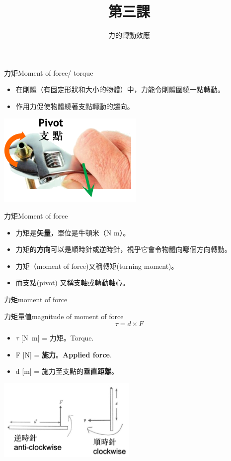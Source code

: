 \documentclass[beamer=true]{standalone}
\title{第三課}
\author{力的轉動效應}
\institute{全年班}
\date{}
\begin{document}
\frame{\titlepage}


\begin{frame}{力矩Moment of force/ torque}
    \begin{itemize}
        \item 在剛體（有固定形狀和大小的物體）中，力能令剛體圍繞一點轉動。
        \item 作用力促使物體繞著支點轉動的趨向。
    \end{itemize}\bigskip
    {\par\centering
        \includegraphics[width=.4\textwidth]{assets/76cf8376.png}
        \par}
\end{frame}
\begin{frame}{力矩Moment of force}
    \begin{itemize}
        \item 力矩是\textbf{矢量}，單位是牛頓米（N m）。
        \item 力矩的\textbf{方向}可以是順時針或逆時針，視乎它會令物體向哪個方向轉動。
        \item 力矩（moment of force)又稱轉矩(turning moment)。
        \item 而支點(pivot) 又稱支軸或轉動軸心。
    \end{itemize}

\end{frame}

\begin{frame}{力矩moment of force}
    \begin{exampleblock}
        {力矩量值magnitude of moment of force}
        \begin{equation}
            \tau = d\times F
        \end{equation}
    \end{exampleblock}
    \begin{itemize}
        \item $\tau$ [\unit{N.m}] = 力矩。Torque.
        \item F [N] = \textbf{施力}。\textbf{Applied force}.
        \item d  [m] = 施力至支點的\textbf{垂直距離}。
    \end{itemize}
    {\par\centering
    \includegraphics[width=0.5\textwidth]{assets/8db14dd2.png}
    \par}
\end{frame}
\end{document}
